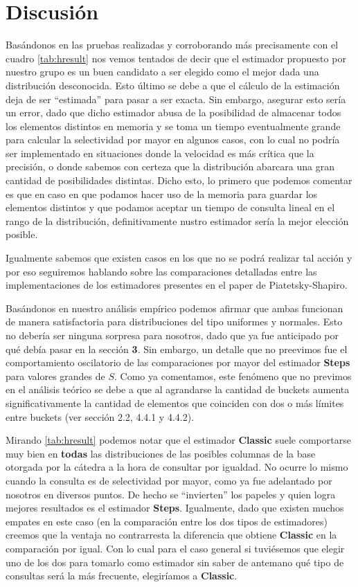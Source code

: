 \section{Discusión}
Basándonos en las pruebas realizadas y corroborando más precisamente con el cuadro \ref{tab:hresult} nos vemos tentados de decir que el estimador propuesto por nuestro grupo es un buen candidato a ser elegido como el mejor dada una distribución desconocida. Esto último se debe a que el cálculo de la estimación deja de ser ``estimada'' para pasar a ser exacta. Sin embargo, asegurar esto sería un error, dado que dicho estimador abusa de la posibilidad de almacenar todos los elementos distintos en memoria y se toma un tiempo eventualmente grande para calcular la selectividad por mayor en algunos casos, con lo cual no podría ser implementado en situaciones donde la velocidad es más crítica que la precisión, o donde sabemos con certeza que la distribución abarcara una gran cantidad de posibilidades distintas. Dicho esto, lo primero que podemos comentar es que en caso en que podamos hacer uso de la memoria para guardar los elementos distintos y que podamos aceptar un tiempo de consulta lineal en el rango de la distribución, definitivamente nustro estimador sería la mejor elección posible.

Igualmente sabemos que existen casos en los que no se podrá realizar tal acción y por eso seguiremos hablando sobre las comparaciones detalladas entre las implementaciones de los estimadores presentes en el paper de Piatetsky-Shapiro.

Basándonos en nuestro análisis empírico podemos afirmar que ambas funcionan de manera satisfactoria para distribuciones del tipo uniformes y normales. Esto no debería ser ninguna sorpresa para nosotros, dado que ya fue anticipado por qué debía pasar en la sección \textbf{3}. Sin embargo, un detalle que no preevimos fue el comportamiento oscilatorio de las comparaciones por mayor del estimador \textbf{Steps} para valores grandes de $S$. Como ya comentamos, este fenómeno que no previmos en el análisis teórico se debe a que al agrandarse la cantidad de buckets aumenta significativamente la cantidad de elementos que coinciden con dos o más límites entre buckets (ver sección 2.2, 4.4.1 y 4.4.2).

Mirando \ref{tab:hresult} podemos notar que el estimador \textbf{Classic} suele comportarse muy bien en \textbf{todas} las distribuciones de las posibles columnas de la base otorgada por la cátedra a la hora de consultar por igualdad. No ocurre lo mismo cuando la consulta es de selectividad por mayor, como ya fue adelantado por nosotros en diversos puntos. De hecho se ``invierten'' los papeles y quien logra mejores resultados es el estimador \textbf{Steps}. Igualmente, dado que existen muchos empates en este caso (en la comparación entre los dos tipos de estimadores) creemos que la ventaja no contrarresta la diferencia que obtiene \textbf{Classic} en la comparación por igual. Con lo cual para el caso general si tuviésemos que elegir uno de los dos para tomarlo como estimador sin saber de antemano qué tipo de consultas será la más frecuente, elegiríamos a \textbf{Classic}.

